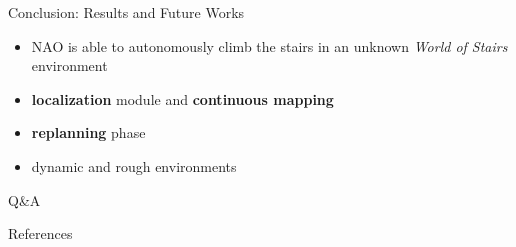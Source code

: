 \documentclass[10pt]{beamer}
\begin{document}
\begin{frame}{Conclusion: Results and Future Works}
  \begin{itemize}
		\item NAO is able to autonomously climb the stairs in an unknown
				\textit{World of Stairs} environment
		\item \textbf{localization} module and \textbf{continuous mapping}
		\item \textbf{replanning} phase
		\item dynamic and rough environments
	\end{itemize}
\end{frame}

\begin{frame}[standout]
    Q\&A
\end{frame}

\appendix

\begin{frame}{References}
  
  
\end{frame}
\end{document}
